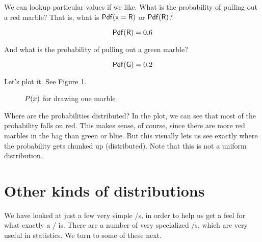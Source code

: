 \documentclass[../../../main.tex]{subfiles}
\begin{document}
\noindent
We can lookup particular values if we like. What is the probability of pulling out a red marble? That is, what is $\Pdf{\RandVarVal/ = R}$ or $\mathsf{Pdf(R)}$?

\begin{equation*}
    \mathsf{Pdf(R)} = 0.6
\end{equation*}

\noindent
And what is the probability of pulling out a green marble?

\begin{equation*}
    \mathsf{Pdf(G)} = 0.2
\end{equation*}

\noindent
Let's plot it. See Figure \ref{plot:example-3}.

\begin{figure}[ht]
  \caption{\label{plot:example-3} $\Probability{\RandVarVal/}$ for drawing one marble}
\end{figure}

Where are the probabilities distributed? In the plot, we can see that most of the probability falls on red. This makes sense, of course, since there are more red marbles in the bag than green or blue. But this visually lets us see exactly where the probability gets chunked up (distributed). Note that this is not a uniform distribution.


\section{Other kinds of distributions}

We have looked at just a few very simple \PDFtext/s, in order to help us get a feel for what exactly a \PDFtext/ is. There are a number of very specialized \PDFtext/s, which are very useful in statistics. We turn to some of these next.
\end{document}
